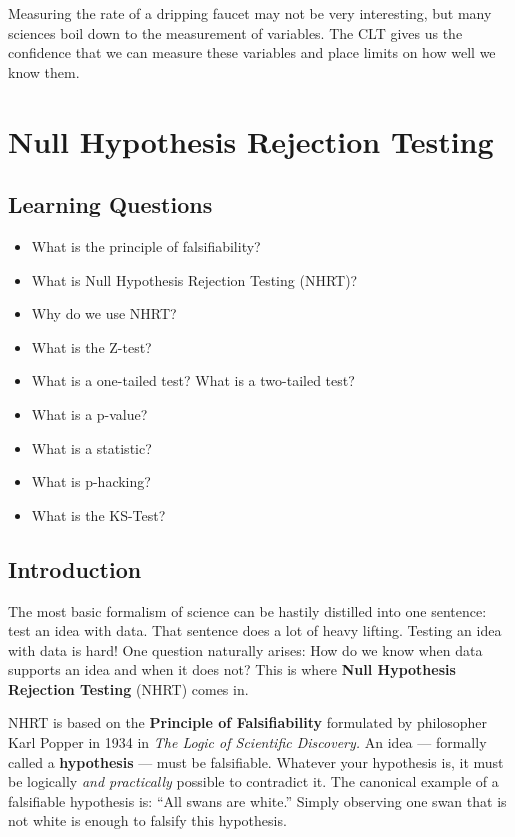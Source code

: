 Measuring the rate of a dripping faucet may not be very interesting, but many sciences boil down to the measurement of variables. The CLT gives us the    confidence that we can measure these variables and place limits on how well we know them.

\clearpage
\section{Null Hypothesis Rejection Testing}
\subsection*{Learning Questions}
\begin{itemize}
    \item What is the principle of falsifiability?
    \item What is Null Hypothesis Rejection Testing (NHRT)?
    \item Why do we use NHRT?
    \item What is the Z-test?
    \item What is a one-tailed test? What is a two-tailed test?
    \item What is a p-value?
    \item What is a statistic?
    \item What is p-hacking?
    \item What is the KS-Test?
\end{itemize}

\subsection*{Introduction}
The most basic formalism of science can be hastily distilled into one sentence: test an idea with data. That sentence does a lot of heavy lifting. Testing an idea with data is hard! One question naturally arises: How do we know when data supports an idea and when it does not? This is where \textbf{Null Hypothesis Rejection Testing} (NHRT) comes in.

NHRT is based on the \textbf{Principle of Falsifiability} formulated by philosopher Karl Popper in 1934 in \textit{The Logic of Scientific Discovery.}  An idea --- formally called a \textbf{hypothesis} --- must be falsifiable. Whatever your hypothesis is, it must be logically \textit{and practically} possible to contradict it. The canonical example of a falsifiable hypothesis is: ``All swans are white.'' Simply observing one swan that is not white is enough to falsify this hypothesis.

